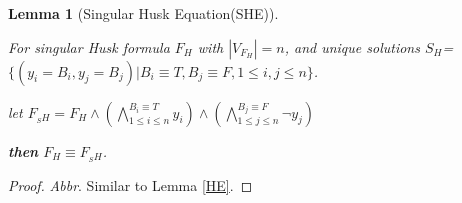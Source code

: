 \documentclass[conference,compsocconf]{IEEEtran}
\newtheorem{lemma}{\textbf{Lemma}}
\begin{document}
\begin{lemma}[Singular Husk Equation(SHE)]\label{SHE}

For singular Husk formula ${F_H}$ with $|V_{F_H}|= n$,
and unique solutions $S_H$=$\{(y_i=B_i,y_j=B_j)|B_i\equiv T, B_j\equiv F, 1\leqslant i, j\leqslant n \}$.

let $F_{_SH}=F_H\wedge (\bigwedge_{1\leqslant i\leqslant n}^{B_i\equiv T}y_i)\wedge(\bigwedge_{1\leqslant j\leqslant n}^{B_j\equiv F}\neg y_j)$

\textbf{then} $F_H \equiv F_{_SH}$.
\end{lemma}
\begin{proof}
\textsl{Abbr}. Similar to Lemma \ref{HE}.
\end{proof}

% 
% 
% 
% 
% 
\end{document}

